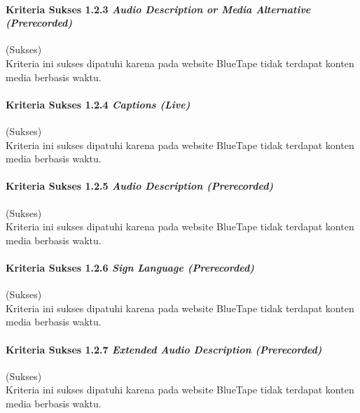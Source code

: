\paragraph{Kriteria Sukses 1.2.3 \textit{Audio Description or Media Alternative (Prerecorded)}}
\label{par:kepatuhan_bluetape_kriteria_sukses_1.2.3}
(Sukses)\\

Kriteria ini sukses dipatuhi karena pada website BlueTape tidak terdapat konten media berbasis waktu.

\paragraph{Kriteria Sukses 1.2.4 \textit{Captions (Live)}}
\label{par:kepatuhan_bluetape_kriteria_sukses_1.2.4}
(Sukses)\\

Kriteria ini sukses dipatuhi karena pada website BlueTape tidak terdapat konten media berbasis waktu.

\paragraph{Kriteria Sukses 1.2.5 \textit{Audio Description (Prerecorded)}}
\label{par:kepatuhan_bluetape_kriteria_sukses_1.2.5}
(Sukses)\\

Kriteria ini sukses dipatuhi karena pada website BlueTape tidak terdapat konten media berbasis waktu.

\paragraph{Kriteria Sukses 1.2.6 \textit{Sign Language (Prerecorded)}}
\label{par:kepatuhan_bluetape_kriteria_sukses_1.2.6}
(Sukses)\\

Kriteria ini sukses dipatuhi karena pada website BlueTape tidak terdapat konten media berbasis waktu.

\paragraph{Kriteria Sukses 1.2.7 \textit{Extended Audio Description (Prerecorded)}}
\label{par:kepatuhan_bluetape_kriteria_sukses_1.2.7}
(Sukses)\\

Kriteria ini sukses dipatuhi karena pada website BlueTape tidak terdapat konten media berbasis waktu.

